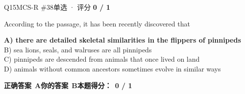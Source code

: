 \begin{qblock}{Q15\quad MCS-R \#38}{单选 · 评分 \textcolor{cAccent}{\bfseries 0 / 1}}
\begin{notebox}According to the passage, it has been recently discovered that\end{notebox}
{\small
{\color{cFix}\textbf{A) there are detailed skeletal similarities in the flippers of pinnipeds}}\\
B) sea lions, seals, and walruses are all pinnipeds\\
C) pinnipeds are descended from animals that once lived on land\\
D) animals without common ancestors sometimes evolve in similar ways}
\par\smallskip
\textbf{正确答案}\ \textcolor{cFix}{\bfseries A}\qquad\textbf{你的答案}\ {\color{cWrong}\bfseries B}\qquad\textbf{本题得分：}\ {\color{cAccent}\bfseries 0 / 1}
\end{qblock}
